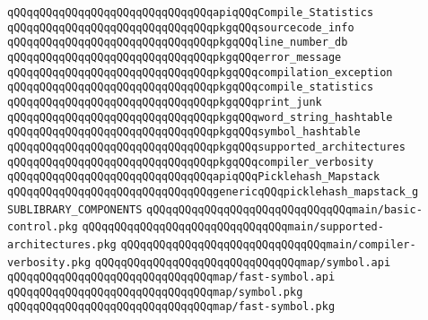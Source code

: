 \verb|qQQqqQQqqQQqqQQqqQQqqQQqqQQqqQQqapiqQQqCompile_Statistics|\newline
\newline
\verb|qQQqqQQqqQQqqQQqqQQqqQQqqQQqqQQqpkgqQQqsourcecode_info|\newline
\verb|qQQqqQQqqQQqqQQqqQQqqQQqqQQqqQQqpkgqQQqline_number_db|\newline
\verb|qQQqqQQqqQQqqQQqqQQqqQQqqQQqqQQqpkgqQQqerror_message|\newline
\verb|qQQqqQQqqQQqqQQqqQQqqQQqqQQqqQQqpkgqQQqcompilation_exception|\newline
\verb|qQQqqQQqqQQqqQQqqQQqqQQqqQQqqQQqpkgqQQqcompile_statistics|\newline
\verb|qQQqqQQqqQQqqQQqqQQqqQQqqQQqqQQqpkgqQQqprint_junk|\newline
\verb|qQQqqQQqqQQqqQQqqQQqqQQqqQQqqQQqpkgqQQqword_string_hashtable|\newline
\verb|qQQqqQQqqQQqqQQqqQQqqQQqqQQqqQQqpkgqQQqsymbol_hashtable|\newline
\verb|qQQqqQQqqQQqqQQqqQQqqQQqqQQqqQQqpkgqQQqsupported_architectures|\newline
\verb|qQQqqQQqqQQqqQQqqQQqqQQqqQQqqQQqpkgqQQqcompiler_verbosity|\newline
\newline
\verb|qQQqqQQqqQQqqQQqqQQqqQQqqQQqqQQqapiqQQqPicklehash_Mapstack|\newline
\verb|qQQqqQQqqQQqqQQqqQQqqQQqqQQqqQQqgenericqQQqpicklehash_mapstack_g|\newline
\newline
\newline
\newline
\verb|SUBLIBRARY_COMPONENTS|\newline
\newline
\verb|qQQqqQQqqQQqqQQqqQQqqQQqqQQqqQQqmain/basic-control.pkg|\newline
\verb|qQQqqQQqqQQqqQQqqQQqqQQqqQQqqQQqmain/supported-architectures.pkg|\newline
\verb|qQQqqQQqqQQqqQQqqQQqqQQqqQQqqQQqmain/compiler-verbosity.pkg|\newline
\newline
\verb|qQQqqQQqqQQqqQQqqQQqqQQqqQQqqQQqmap/symbol.api|\newline
\verb|qQQqqQQqqQQqqQQqqQQqqQQqqQQqqQQqmap/fast-symbol.api|\newline
\verb|qQQqqQQqqQQqqQQqqQQqqQQqqQQqqQQqmap/symbol.pkg|\newline
\verb|qQQqqQQqqQQqqQQqqQQqqQQqqQQqqQQqmap/fast-symbol.pkg|\newline
